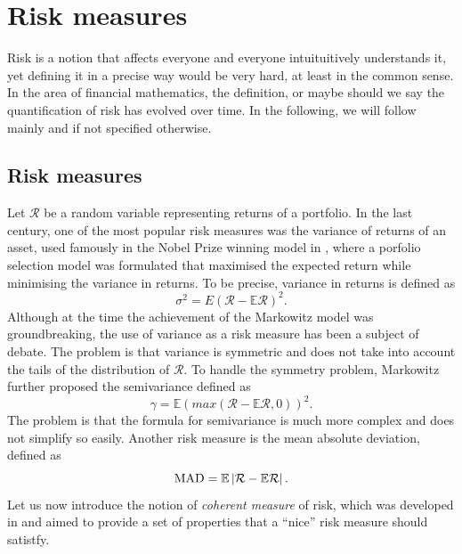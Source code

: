 \chapter{Risk measures}
Risk is a notion that affects everyone and everyone intuituitively understands it, yet defining it in a precise way would be very hard, at least in the common sense. In the area of financial mathematics, the definition, or maybe should we say the quantification of risk has evolved over time. In the following, we will follow mainly \cite{leoppold_risk_measures} and \cite[p. 275-278]{cornuejols_tutuncu_2006} if not specified otherwise.

\section{Risk measures	}
Let $\mathcal{R}$ be a random variable representing returns of a portfolio. In the last century, one of the most popular risk measures was the variance of returns of an asset, used famously in the Nobel Prize winning model in \cite{markowitz}, where a porfolio selection model was formulated that maximised the expected return while minimising the variance in returns. To be precise, variance in returns is defined as
\begin{equation*}
\sigma^2=E(\mathcal{R} - \mathbb{E}\mathcal{R} )^2.
\end{equation*}
Although at the time the achievement of the Markowitz model was groundbreaking, the use of variance as a risk measure has been a subject of debate. The problem is that variance is symmetric and does not take into account the tails of the distribution of $\mathcal{R}$. To handle the symmetry problem, Markowitz further proposed the semivariance defined as
\begin{equation*}
\gamma=\mathbb{E}(max(\mathcal{R} - \mathbb{E}\mathcal{R},0))^2.
\end{equation*}
The problem is that the formula for semivariance is much more complex and does not simplify so easily. Another risk measure is the mean absolute deviation, defined as
\begin{equation*}
\mathrm{MAD}=\mathbb{E}\left|{\mathcal{R} - \mathbb{E}\mathcal{R}}\right|.
\end{equation*}
Let us now introduce the notion of \textit{coherent measure} of risk, which was developed in \cite[Defintion 2.4.]{coherent_measures_of_risk} and aimed to provide a set of properties that a “nice” risk measure should satistfy.
